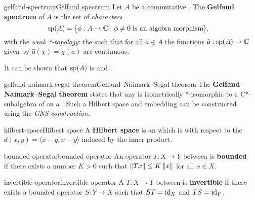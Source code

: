 \begin{topic}{gelfand-spectrum}{Gelfand spectrum}
    Let $A$ be a commutative . The \textbf{Gelfand spectrum} of $A$ is the set of \textit{characters}
    \[ \textup{sp}(A) = \{ \phi : A \to \mathbb{C} \;|\; \phi \ne 0 \textup{ is an algebra morphism} \} , \]
    with the \textit{weak *-topology}: the   such that for all $a \in A$ the functions $\hat{a} : \textup{sp}(A) \to \mathbb{C}$ given by $\hat{a}(\chi) = \chi(a)$ are continuous.
    
    It can be shown that $\textup{sp}(A)$ is  and .
\end{topic}

\begin{topic}{gelfand-naimark-segal-theorem}{Gelfand--Naimark--Segal theorem}
    The \textbf{Gelfand--Naimark--Segal theorem} states that any  is isometrically *-isomorphic to a C*-subalgebra of  on a . Such a Hilbert space and embedding can be constructed using the \textit{GNS construction}.
\end{topic}

\begin{topic}{hilbert-space}{Hilbert space}
    A \textbf{Hilbert space} is an  which is  with respect to the  $d(x, y) = \langle x - y, x - y \rangle$ induced by the inner product.
\end{topic}

\begin{topic}{bounded-operator}{bounded operator}
    An operator $T : X \to Y$ between   is \textbf{bounded} if there exists a number $K > 0$ such that $\left\|Tx\right\| \le K \left\|x\right\|$ for all $x \in X$.
\end{topic}

\begin{topic}{invertible-operator}{invertible operator}
    A  $T : X \to Y$ between   is \textbf{invertible} if there exists a bounded operator $S : Y \to X$ such that $ST = \text{id}_X$ and $TS = \text{id}_Y$.
\end{topic}

